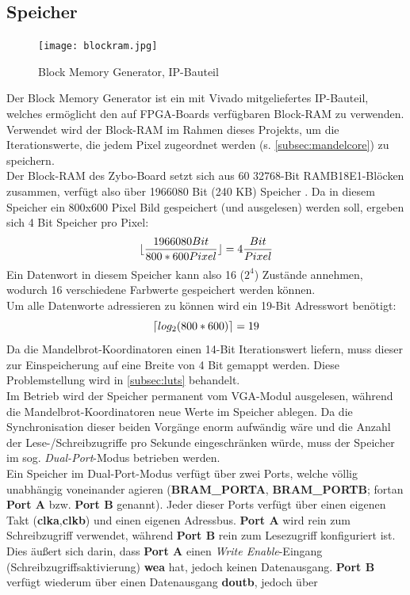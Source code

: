 \documentclass[a4paper,12pt,onesided]{report}
\begin{document}
\subsection{Speicher}
\label{subsec:ram}
\begin{figure}[H]
	\centering
	\texttt{[image: blockram.jpg]}
	\caption{Block Memory Generator, IP-Bauteil}
	\label{fig:schem_bram}
\end{figure}
Der Block Memory Generator ist ein mit Vivado %
mitgeliefertes IP-Bauteil, welches ermöglicht den auf FPGA-Boards verfügbaren Block-RAM zu verwenden.\\
Verwendet wird der Block-RAM im Rahmen dieses Projekts, um die Iterationswerte, die jedem Pixel zugeordnet werden (s. \autoref{subsec:mandelcore}) zu speichern.\\
Der Block-RAM des Zybo-Board setzt sich aus 60 32768-Bit RAMB18E1-Blöcken zusammen, verfügt also über 1966080 Bit (240 KB) Speicher \cite[S. 14]{bram} \cite{zyboref}.
Da in diesem Speicher ein 800x600 Pixel Bild gespeichert (und ausgelesen) werden soll, ergeben sich 4 Bit Speicher pro Pixel:
\[\lfloor\frac{1966080 Bit}{800*600 Pixel}\rfloor=4 \frac{Bit}{Pixel} \]
Ein Datenwort in diesem Speicher kann also 16 ($2^4$) Zustände annehmen, wodurch 16 verschiedene Farbwerte gespeichert werden können.\\
Um alle Datenworte adressieren zu können wird ein 19-Bit Adresswort benötigt:
\[\lceil log_2{(800*600)}\rceil=19\]
Da die Mandelbrot-Koordinatoren einen 14-Bit Iterationswert liefern, muss dieser zur Einspeicherung auf eine Breite von 4 Bit gemappt werden. Diese Problemstellung wird in \autoref{subsec:luts} behandelt.\\
Im Betrieb wird der Speicher permanent vom VGA-Modul ausgelesen, während die Mandelbrot-Koordinatoren neue Werte im Speicher ablegen. Da die Synchronisation dieser beiden Vorgänge enorm aufwändig wäre und die Anzahl der Lese-/Schreibzugriffe pro Sekunde eingeschränken würde, muss der Speicher im sog. \textit{Dual-Port}-Modus betrieben werden.\\
Ein Speicher im Dual-Port-Modus verfügt über zwei Ports, welche völlig unabhängig voneinander agieren (\textbf{BRAM\_PORTA}, \textbf{BRAM\_PORTB}; fortan \textbf{Port A} bzw. \textbf{Port B} genannt). 
Jeder dieser Ports verfügt über einen eigenen Takt (\textbf{clka},\textbf{clkb}) und einen eigenen Adressbus.
\textbf{Port A} wird rein zum Schreibzugriff verwendet, während \textbf{Port B} rein zum Lesezugriff konfiguriert ist. Dies äußert sich darin, dass \textbf{Port A} einen \textit{Write Enable}-Eingang (Schreibzugriffsaktivierung) \textbf{wea} hat, jedoch keinen Datenausgang. 
\textbf{Port B} verfügt wiederum über einen Datenausgang \textbf{doutb}, jedoch über %
\end{document}
